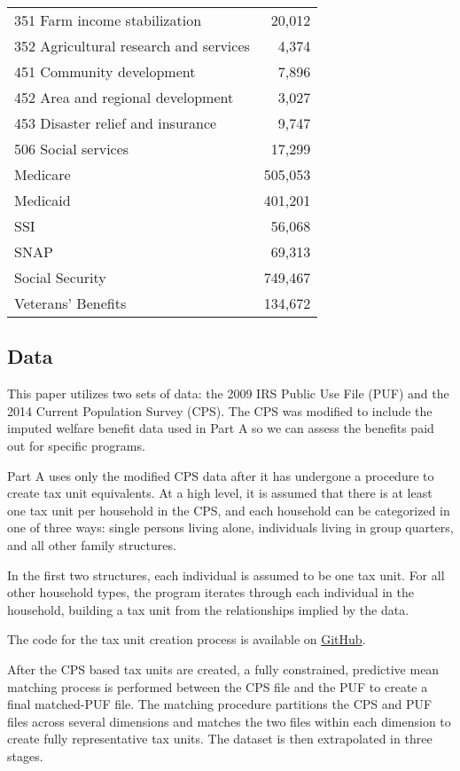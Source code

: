 \documentclass{article}
\begin{document}
\begin{table}[H]
\begin{center}
\begin{adjustbox}{max width=\textwidth}
\begin{tabular}{lr}
351 Farm income stabilization & 20,012 \\
352 Agricultural research and services & 4,374 \\
451 Community development & 7,896 \\
452 Area and regional development & 3,027 \\
453 Disaster relief and insurance & 9,747 \\
506 Social services & 17,299 \\
Medicare & 505,053 \\
Medicaid & 401,201 \\
SSI & 56,068 \\
SNAP & 69,313 \\
Social Security & 749,467 \\
Veterans' Benefits & 134,672 \\
\bottomrule
\end{tabular}
\end{adjustbox}
\end{center}
\end{table}
\doublespacing 

\subsection{Data}
This paper utilizes two sets of data: the 2009 IRS Public Use File (PUF) and the 2014 Current Population Survey (CPS). The CPS was modified to include the imputed welfare benefit data used in Part A so we can assess the benefits paid out for specific programs.

Part A uses only the modified CPS data after it has undergone a procedure to create tax unit equivalents. At a high level, it is assumed that there is at least one tax unit per household in the CPS, and each household can be categorized in one of three ways: single persons living alone, individuals living in group quarters, and all other family structures.

In the first two structures, each individual is assumed to be one tax unit. For all other household types, the program iterates through each individual in the household, building a tax unit from the relationships implied by the data.

The code for the tax unit creation process is available on \href{https://github.com/open-source-economics/taxdata}{GitHub}.

After the CPS based tax units are created, a fully constrained, predictive mean matching process is performed between the CPS file and the PUF to create a final matched-PUF file. The matching procedure partitions the CPS and PUF files across several dimensions and matches the two files within each dimension to create fully representative tax units. The dataset is then extrapolated in three stages.
\end{document}
